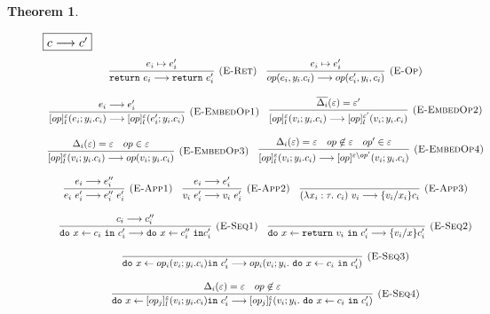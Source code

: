 \documentclass{article}
\newtheorem{theorem}{Theorem}[section]
\newcommand{\m}[1]{\ \texttt{#1}\ }
\begin{document}
\begin{theorem}
\begin{figure}[H]
{$\fbox{$c \longrightarrow c'$}$
\[
\begin{array}{c}
\infer[\textsc{(E-Ret)}]
  {\texttt{return}\ e_i \longrightarrow \texttt{return}\ e_i'}
  {e_i \mapsto e_i'} \quad
  
\infer[\textsc{(E-Op)}]
  {op(e_i,y_i.c_i) \longrightarrow op(e_i', y_i, c_i)}
  {e_i \mapsto e_i'} \\[3ex]
 
 
\infer[\textsc{(E-EmbedOp1)}]
{[op]^\varepsilon_l(e_i; y_i.c_i) \longrightarrow [op]^{\varepsilon}_l(e_i'; y_i.c_i) }
{e_i \longrightarrow e_i'} \quad
 
\infer[\textsc{(E-EmbedOp2)}]
{[op]^\varepsilon_l(v_i; y_i.c_i) \longrightarrow [op]^{\varepsilon'}_l(v_i; y_i.c_i) }
{\overline{\Delta_i}(\varepsilon) = \varepsilon'} \\[3ex]

\infer[\textsc{(E-EmbedOp3)}]
{[op]^\varepsilon_l(v_i; y_i.c_i) \longrightarrow op(v_i; y_i.c_i) }
{\Delta_i(\varepsilon) = \varepsilon & op \in \varepsilon} \quad

\infer[\textsc{(E-EmbedOp4)}]
{[op]^\varepsilon_l(v_i; y_i.c_i) \longrightarrow [op]^{\varepsilon \setminus op'}(v_i; y_i.c_i) }
{\Delta_i(\varepsilon) = \varepsilon & op \not\in \varepsilon & op' \in \varepsilon} \\[3ex]


\infer[\textsc{(E-App1)}]
  {e_i\ e_i' \longrightarrow e_i''\ e_i'}
  {e_i \longrightarrow e_i''}  \quad
  
\infer[\textsc{(E-App2)}]
  {v_i \ e_i' \longrightarrow v_i\ e_i'}
  {e_i\longrightarrow e_i'}  \quad
  
\infer[\textsc{(E-App3)}]
  {(\lambda x_i:\tau.\ c_i) \ v_i \longrightarrow \{v_i/x_i\}c_i}
  {} \\[3ex]
  
  
\infer[\textsc{(E-Seq1)}]
  {\texttt{do}\ x \leftarrow c_i\ \texttt{in}\ c_i' \longrightarrow \texttt{do}\ x \leftarrow c_i''\ \texttt{in} c_i'}
  {c_i \longrightarrow c_i''}  \quad
  
\infer[\textsc{(E-Seq2)}]
  {\texttt{do}\ x \leftarrow \texttt{return}\ v_i \ \texttt{in}\ c_i' \longrightarrow \{v_i/x\} c_i'}
  {} \\[3ex]
  
\infer[\textsc{(E-Seq3)}]
  {\texttt{do}\ x \leftarrow op_i(v_i; y_i.c_i) \texttt{in}\ c_i' \longrightarrow op_i(v_i; y_i. \m{do} x \leftarrow c_i \m{in} c_i')}
  {} \\[3ex]
  
\infer[\textsc{(E-Seq4)}]
  {\texttt{do}\ x \leftarrow [op_j]^\varepsilon_l(v_i; y_i.c_i) \texttt{in}\ c_i' \longrightarrow [op_j]^\varepsilon_l(v_i; y_i. \m{do} x \leftarrow c_i \m{in} c_i')}
  {\Delta_i(\varepsilon) = \varepsilon & op \not \in \varepsilon} \\[3ex]
  


\end{array}\]}
\end{figure}
\end{theorem}
\end{document}

